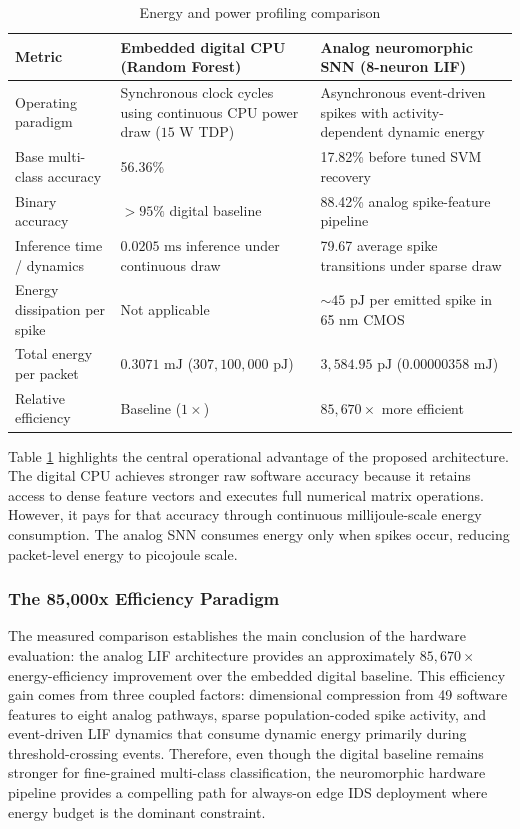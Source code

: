 \documentclass{ieeeaccess}
\begin{document}
\begin{table}[!t]
\centering
\caption{Energy and power profiling comparison}
\label{tab:energycomparison}
\begin{tabular}{|p{}|p{}|p{}|}
\hline
\textbf{Metric} & \textbf{Embedded digital CPU (Random Forest)} & \textbf{Analog neuromorphic SNN (8-neuron LIF)} \\
\hline
Operating paradigm & Synchronous clock cycles using continuous CPU power draw ($15\text{ W}$ TDP) & Asynchronous event-driven spikes with activity-dependent dynamic energy \\
\hline
Base multi-class accuracy & 56.36\% & 17.82\% before tuned SVM recovery \\
\hline
Binary accuracy & $>95\%$ digital baseline & 88.42\% analog spike-feature pipeline \\
\hline
Inference time / dynamics & $0.0205\text{ ms}$ inference under continuous draw & 79.67 average spike transitions under sparse draw \\
\hline
Energy dissipation per spike & Not applicable & $\sim45\text{ pJ}$ per emitted spike in 65 nm CMOS \\
\hline
Total energy per packet & $0.3071\text{ mJ}$ ($307{,}100{,}000\text{ pJ}$) & $3{,}584.95\text{ pJ}$ ($0.00000358\text{ mJ}$) \\
\hline
Relative efficiency & Baseline ($1\times$) & $85{,}670\times$ more efficient \\
\hline
\end{tabular}
\end{table}

Table \ref{tab:energycomparison} highlights the central operational advantage of the proposed architecture. The digital CPU achieves stronger raw software accuracy because it retains access to dense feature vectors and executes full numerical matrix operations. However, it pays for that accuracy through continuous millijoule-scale energy consumption. The analog SNN consumes energy only when spikes occur, reducing packet-level energy to picojoule scale.

\subsubsection{The 85,000x Efficiency Paradigm}
The measured comparison establishes the main conclusion of the hardware evaluation: the analog LIF architecture provides an approximately $85{,}670\times$ energy-efficiency improvement over the embedded digital baseline. This efficiency gain comes from three coupled factors: dimensional compression from 49 software features to eight analog pathways, sparse population-coded spike activity, and event-driven LIF dynamics that consume dynamic energy primarily during threshold-crossing events. Therefore, even though the digital baseline remains stronger for fine-grained multi-class classification, the neuromorphic hardware pipeline provides a compelling path for always-on edge IDS deployment where energy budget is the dominant constraint.
\end{document}

